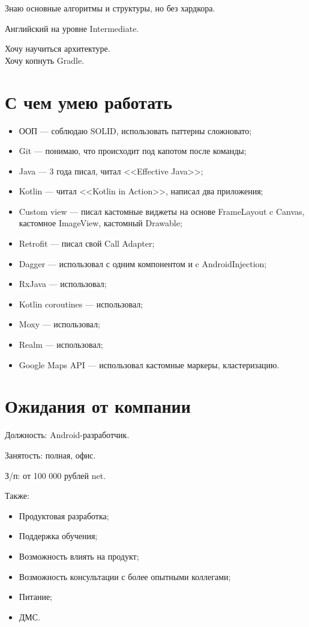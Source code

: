 \documentclass[a4paper,12pt]{article}
\begin{document}
    Знаю основные алгоритмы и структуры, но без хардкора.

    Английский на уровне Intermediate.

    Хочу научиться архитектуре.\\
    Хочу копнуть Gradle.

    \section*{С чем умею работать}%

    \begin{itemize}
        \item ООП --- соблюдаю SOLID, использовать паттерны сложновато;
        \item Git --- понимаю, что происходит под капотом после команды;
        \item Java --- 3 года писал, читал <<Effective Java>>;
        \item Kotlin --- читал <<Kotlin in Action>>, написал два приложения;
        \item Custom view --- писал кастомные виджеты на основе FrameLayout c Canvas, кастомное ImageView, кастомный Drawable;
        \item Retrofit --- писал свой Call Adapter;
        \item Dagger --- использовал с одним компонентом и c AndroidInjection;
        \item RxJava --- использовал;
        \item Kotlin coroutines --- использовал;
        \item Moxy --- использовал;
        \item Realm --- использовал;
        \item Google Maps API --- использовал кастомные маркеры, кластеризацию.
    \end{itemize}

    \section*{Ожидания от компании}

    Должность: Android-разработчик.\par
    Занятость: полная, офис.\par
    З/п: от 100 000 рублей net.\par
    Также:
    \begin{itemize}
        \item Продуктовая разработка;
        \item Поддержка обучения;
        \item Возможность влиять на продукт;
        \item Возможность консультации с более опытными коллегами;
        \item Питание;
        \item ДМС.
    \end{itemize}
\end{document}
